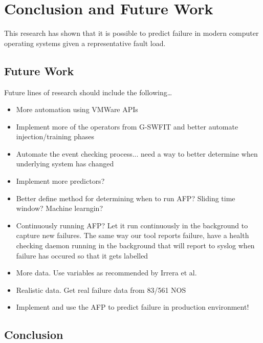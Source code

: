\chapter{Conclusion and Future Work} \label{chapter5}
This research has shown that it is possible to predict failure in modern
computer operating systems given a representative fault load.

\section{Future Work}
Future lines of research should include the following\dots

\begin{itemize}
\item{More automation using VMWare APIs}
\item{Implement more of the operators from G-SWFIT and better automate
injection/training phases}
\item{Automate the event checking process... need a way to better determine
when underlying system has changed}
\item{Implement more predictors?}
\item{Better define method for determining when to run AFP? Sliding time
window?  Machine learngin?}
\item{Continuously running AFP?  Let it run continuously in the background to
capture new failures.  The same way our tool reports failure, have a health
checking daemon running in the background that will report to syslog when
failure has occured so that it gets labelled}
\item{More data.  Use variables as recommended by Irrera et al.}
\item{Realistic data.  Get real failure data from 83/561 NOS}
\item{Implement and use the AFP to predict failure in production environment!}
\end{itemize}

\section{Conclusion}

